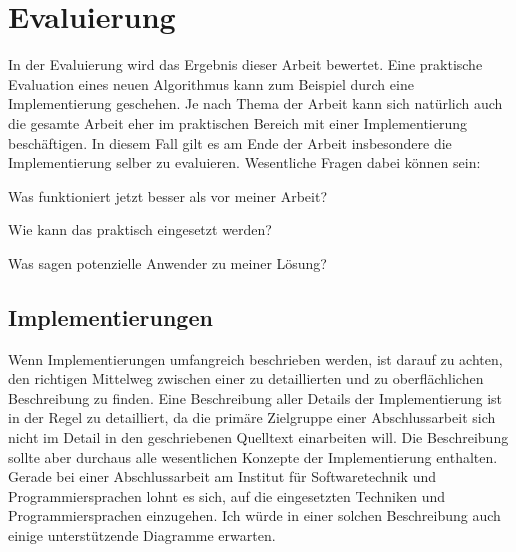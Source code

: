 
\chapter{Evaluierung}
\label{chapter-evaluation}

In der Evaluierung wird das Ergebnis dieser Arbeit bewertet. Eine praktische Evaluation eines neuen Algorithmus kann zum Beispiel durch eine Implementierung geschehen. Je nach Thema der Arbeit kann sich natürlich auch die gesamte Arbeit eher im praktischen Bereich mit einer Implementierung beschäftigen. In diesem Fall gilt es am Ende der Arbeit insbesondere die Implementierung selber zu evaluieren. Wesentliche Fragen dabei können sein:
\begin{compactitem}[--]
  \item Was funktioniert jetzt besser als vor meiner Arbeit?
  \item Wie kann das praktisch eingesetzt werden?
  \item Was sagen potenzielle Anwender zu meiner Lösung?
\end{compactitem}

\section{Implementierungen}

Wenn Implementierungen umfangreich beschrieben werden, ist darauf zu achten, den richtigen Mittelweg zwischen einer zu detaillierten und zu oberflächlichen Beschreibung zu finden. Eine Beschreibung aller Details der Implementierung ist in der Regel zu detailliert, da die primäre Zielgruppe einer Abschlussarbeit sich nicht im Detail in den geschriebenen Quelltext einarbeiten will. Die Beschreibung sollte aber durchaus alle wesentlichen Konzepte der Implementierung enthalten. Gerade bei einer Abschlussarbeit am Institut für Softwaretechnik und Programmiersprachen lohnt es sich, auf die eingesetzten Techniken und Programmiersprachen einzugehen. Ich würde in einer solchen Beschreibung auch einige unterstützende Diagramme erwarten.

